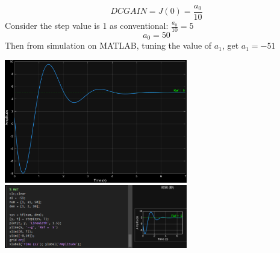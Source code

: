 \documentclass[12pt]{article}
\begin{document}
    \[DC GAIN = J(0) = \frac{a_0}{10}\]
    Consider the step value is 1 as conventional: $\frac{a_0}{10}  = 5$
    \[a_0 = 50\]
    Then from simulation on MATLAB, tuning the value of $a_1$, get $a_1 = -51$
    \begin{center}
        \includegraphics[width=0.6\textwidth]{Q7.png}
        \includegraphics[width=0.6\textwidth]{Q7m.png}
    \end{center}
\end{document}
